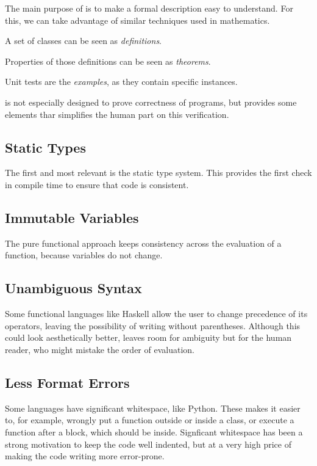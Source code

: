 The main purpose of \Soda is to make a formal description easy to understand.
For this, we can take advantage of similar techniques used in mathematics.

A set of \Soda classes can be seen as \textit{definitions}.

Properties of those definitions can be seen as \textit{theorems}.

Unit tests are the \textit{examples}, as they contain specific instances.

\Soda is not especially designed to prove correctness of programs, but provides some elements thar simplifies the human part on this verification.

\subsection{Static Types}

The first and most relevant is the static type system.
This provides the first check in compile time to ensure that \Soda code is consistent.

\subsection{Immutable Variables}

The pure functional approach keeps consistency across the evaluation of a function, because variables do not change.

\subsection{Unambiguous Syntax}

Some functional languages like Haskell allow the user to change precedence of its operators, leaving the possibility of writing without parentheses.
Although this could look aesthetically better, leaves room for ambiguity but for the human reader, who might mistake the order of evaluation.

\subsection{Less Format Errors}

Some languages have significant whitespace, like Python.
These makes it easier to, for example, wrongly put a function outside or inside a class, or execute a function after a block, which should be inside.
Signficant whitespace has been a strong motivation to keep the code well indented, but at a very high price of making the code writing more error-prone.

